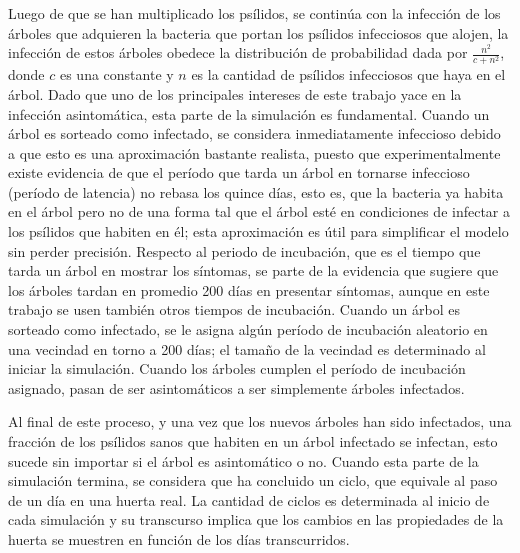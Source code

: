 Luego de que se han multiplicado los psílidos, se continúa con la infección de los árboles que adquieren la bacteria que portan los psílidos infecciosos que alojen, la infección de estos árboles obedece la distribución de probabilidad dada por $ \frac{n^2}{c+n^2}$, donde $c$ es una constante y $n$ es la cantidad de psílidos infecciosos que haya en el árbol. Dado que uno de los principales intereses de este trabajo yace en la infección asintomática, esta parte de la simulación es fundamental. Cuando un árbol es sorteado como infectado, se considera inmediatamente infeccioso debido a que esto es una aproximación bastante realista, puesto que experimentalmente existe evidencia de que el período que tarda un árbol en tornarse infeccioso (período de latencia) no rebasa los quince días, esto es, que la bacteria ya habita en el árbol pero no de una forma tal que el árbol esté en condiciones de infectar a los psílidos que habiten en él; esta aproximación es útil para simplificar el modelo sin perder precisión. Respecto al periodo de incubación, que es el tiempo que tarda un árbol en mostrar  los síntomas, se parte de la evidencia que sugiere que los árboles tardan en promedio 200 días en presentar síntomas, aunque en este trabajo se usen también otros tiempos de incubación. Cuando un árbol es sorteado como infectado, se le asigna algún período de incubación aleatorio en una vecindad en torno a 200 días; el tamaño de la vecindad es determinado al iniciar la simulación. Cuando los árboles cumplen el período de incubación asignado, pasan de ser asintomáticos a ser simplemente árboles infectados.

Al final de este proceso, y una vez que los nuevos árboles han sido infectados, una fracción de los psílidos sanos que habiten en un árbol infectado se infectan, esto sucede sin importar si el árbol es asintomático o no. Cuando esta parte de la simulación termina, se considera que ha concluido un ciclo, que equivale al paso de un día en una huerta real. La cantidad de ciclos es determinada al inicio de cada simulación y su transcurso implica que los cambios en las propiedades de la huerta se muestren en función de los días transcurridos.

